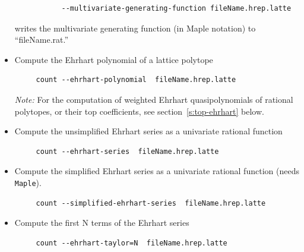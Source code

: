 \documentclass{article}
\newcommand{\maple}{{\tt Maple}\xspace}
\begin{document}
\begin{itemize}
\begin{verbatim}
           --multivariate-generating-function fileName.hrep.latte
        \end{verbatim}
  writes the multivariate generating function (in Maple notation) to ``fileName.rat.''
\item Compute the Ehrhart polynomial of a lattice polytope
        \begin{verbatim}
     count --ehrhart-polynomial  fileName.hrep.latte
        \end{verbatim} 
  \emph{Note:}  For the computation of weighted Ehrhart quasipolynomials of rational
  polytopes, or their top coefficients, see section~\ref{s:top-ehrhart} below. 
\item Compute the unsimplified Ehrhart series as a univariate rational function
        \begin{verbatim}
     count --ehrhart-series  fileName.hrep.latte
        \end{verbatim} 
\item Compute the simplified Ehrhart series as a univariate rational function (needs \maple).
        \begin{verbatim}
     count --simplified-ehrhart-series  fileName.hrep.latte
        \end{verbatim} 
\item Compute the first N terms of the Ehrhart series
        \begin{verbatim}
     count --ehrhart-taylor=N  fileName.hrep.latte
        \end{verbatim} 
\end{itemize}
\end{document}
